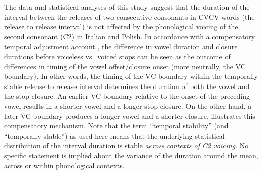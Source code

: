 \documentclass[charis]{glossa}
\begin{document}
The data and statistical analyses of this study suggest that the
duration of the interval between the releases of two consecutive
consonants in CV́CV words (the release to release interval) is not
affected by the phonological voicing of the second consonant (C2) in
Italian and Polish. In accordance with a compensatory temporal
adjustment account \citep{slis1969, lehiste1970}, the difference in
vowel duration and closure durations before voiceless vs.~voiced stops
can be seen as the outcome of differences in timing of the vowel
offset/closure onset (more neutrally, the VC boundary). In other words,
the timing of the VC boundary within the temporally stable release to
release interval determines the duration of both the vowel and the stop
closure. An earlier VC boundary relative to the onset of the preceding
vowel results in a shorter vowel and a longer stop closure. On the other
hand, a later VC boundary produces a longer vowel and a shorter closure.
 illustrates this compensatory mechanism. Note that
the term ``temporal stability'' (and ``temporally stable'') as used here
means that the underlying statistical distribution of the interval
duration is stable \emph{across contexts of C2 voicing}. No specific
statement is implied about the variance of the duration around the mean,
across or within phonological contexts.
\end{document}
